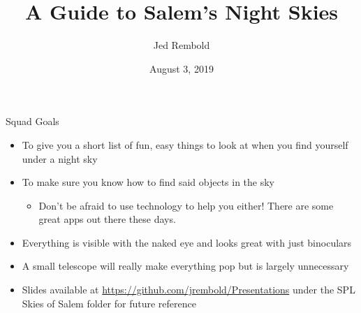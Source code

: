 \documentclass[pdf, ]{beamer}
\title{A Guide to Salem's Night Skies}
\author{Jed Rembold}
\institute{Willamette University}
\date{August 3, 2019}
\begin{document}
\renewcommand{\theenumi}{\Alph{enumi}}

{
	\maketitle
}

\begin{frame}{Squad Goals}
	\begin{itemize}
		\item To give you a short list of fun, easy things to look at when you find yourself under a night sky
		\item To make sure you know how to find said objects in the sky
			\begin{itemize}
				\item Don't be afraid to use technology to help you either! There are some great apps out there these days.
			\end{itemize}
			
		\item Everything is visible with the naked eye and looks great with just binoculars
		\item A small telescope will really make everything pop but is largely unnecessary
		\item Slides available at \url{https://github.com/jrembold/Presentations} under the SPL Skies of Salem folder for future reference

	\end{itemize}
	
\end{frame}
\end{document}

